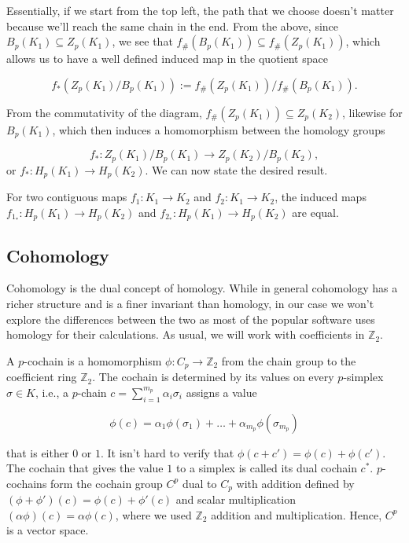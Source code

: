 Essentially, if we start from the top left, the path that we choose doesn't matter because we'll reach the same chain in the end. From the above, since $B_{p}(K_{1}) \subseteq Z_{p}(K_{1})$, we see that $f_{\#}(B_{p}(K_{1})) \subseteq f_{\#}(Z_{p}(K_{1}))$, which allows us to have a well defined induced map in the quotient space

\begin{equation*}
  f_{*}(Z_{p}(K_{1})/B_{p}(K_{1})) := f_{\#}(Z_{p}(K_{1})) / f_{\#}(B_{p}(K_{1})).
\end{equation*}

From the commutativity of the diagram, $f_{\#}(Z_{p}(K_{1})) \subseteq Z_{p}(K_{2})$, likewise for $B_{p}(K_{1})$, which then induces a homomorphism between the homology groups

\begin{equation*}
  f_{*}: Z_{p}(K_{1})/B_{p}(K_{1}) \to Z_{p}(K_{2})/B_{p}(K_{2}),
\end{equation*}
or $f_{*}: H_{p}(K_{1}) \to H_{p}(K_{2})$. We can now state the desired result.

\begin{lemma}
  For two contiguous maps $f_{1}: K_{1} \to K_{2}$ and $f_{2}: K_{1} \to K_{2}$, the induced maps $f_{1_{*}}: H_{p}(K_{1}) \to H_{p}(K_{2})$ and $f_{2_{*}}: H_{p}(K_{1}) \to H_{p}(K_{2})$ are equal.
\end{lemma}

\subsection{Cohomology}
Cohomology is the dual concept of homology. While in general cohomology has a richer structure and is a finer invariant than homology, in our case we won't explore the differences between the two as most of the popular software uses homology for their calculations. As usual, we will work with coefficients in $\mathbb{Z}_{2}$.

A $p$-cochain is a homomorphism $\phi: C_{p} \to \mathbb{Z}_{2}$ from the chain group to the coefficient ring $\mathbb{Z}_{2}$. The cochain is determined by its values on every $p$-simplex $\sigma \in K$, i.e., a $p$-chain $c = \sum_{i=1}^{m_{p}}\alpha_{i}\sigma_{i}$ assigns a value

\begin{equation*}
  \phi(c) = \alpha_{1}\phi(\sigma_{1}) + \ldots + \alpha_{m_{p}}\phi(\sigma_{m_{p}})
\end{equation*}

that is either $0$ or $1$. It isn't hard to verify that $\phi(c + c') = \phi(c) + \phi(c')$. The cochain that gives the value $1$ to a simplex is called its dual cochain $c^{*}$. $p$-cochains form the cochain group $C^{p}$ dual to $C_{p}$ with addition defined by $(\phi + \phi')(c) = \phi(c) + \phi'(c)$ and scalar multiplication $(\alpha \phi)(c) = \alpha \phi(c)$, where we used $\mathbb{Z}_{2}$ addition and multiplication. Hence, $C^{p}$ is a vector space.

